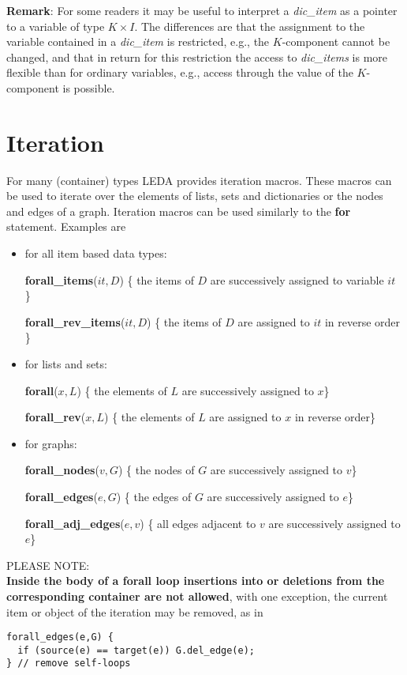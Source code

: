 {\bf Remark}: For some readers it may be useful to interpret a {\it dic\_item}
as a pointer to a variable of type $K \times  I$. The differences are that
the assignment to the variable contained in a {\it dic\_item} is restricted,
e.g., the $K$-component cannot be changed, and that in return for this
restriction the access to {\it dic\_items} is more flexible than for ordinary
variables, e.g., access through the value of the $K$-component is possible.


\section{Iteration}

\label{Iteration}
For many (container) types LEDA provides iteration macros. These macros can be
used to iterate over the elements of lists, sets and dictionaries or the nodes
and edges of a graph.  Iteration macros can be used similarly to the \CC{}
{\bf for} statement. Examples are

\begin{itemize}
\item for all item based data types:

{\bf forall\_items}($it,D$) 
\{ the items of $D$ are successively assigned to variable $it$ \}

{\bf forall\_rev\_items}($it,D$) 
\{ the items of $D$ are assigned to $it$ in reverse order \}

\item for lists and sets:

{\bf forall}($x,L$)
\{ the elements of $L$ are successively assigned to $x$\}

{\bf forall\_rev}($x,L$)
\{ the elements of $L$ are assigned to $x$ in reverse order\}

\item for graphs:

{\bf forall\_nodes}($v,G$)
\{ the nodes of $G$ are successively assigned to $v$\}

{\bf forall\_edges}($e,G$)
\{ the edges of $G$ are successively assigned to $e$\}

{\bf forall\_adj\_edges}($e,v$)
\{ all edges adjacent to $v$ are successively assigned to $e$\}
\end{itemize}

PLEASE NOTE:\\
{\bf Inside the body of a forall loop insertions into or deletions from the
corresponding container are not allowed}, with one exception,
the current item or object of the iteration may be removed, as in  
\begin{verbatim}
forall_edges(e,G) {
  if (source(e) == target(e)) G.del_edge(e);
} // remove self-loops
\end{verbatim}

